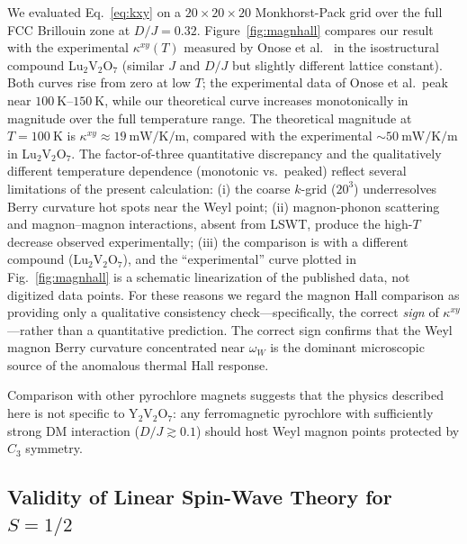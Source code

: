 \documentclass[aps,prb,twocolumn,superscriptaddress,longbibliography]{revtex4-2}
\begin{document}
We evaluated Eq.~\eqref{eq:kxy} on a $20\times20\times20$ Monkhorst-Pack
grid over the full FCC Brillouin zone at $D/J = 0.32$.
Figure~\ref{fig:magnhall} compares our result with the experimental
$\kappa^{xy}(T)$ measured by Onose et al.~\cite{Onose2010} in the
isostructural compound Lu$_2$V$_2$O$_7$ (similar $J$ and $D/J$ but
slightly different lattice constant).
Both curves rise from zero at low $T$; the experimental data of
Onose et al.\ peak near $\SI{100}{\kelvin}$--$\SI{150}{\kelvin}$, while
our theoretical curve increases monotonically in magnitude over the full
temperature range.
The theoretical magnitude at $T = \SI{100}{\kelvin}$ is
$\kappa^{xy} \approx \SI{19}{\milli\watt\per\kelvin\per\metre}$,
compared with the experimental
$\sim \SI{50}{\milli\watt\per\kelvin\per\metre}$ in Lu$_2$V$_2$O$_7$.
The factor-of-three quantitative discrepancy and the qualitatively different
temperature dependence (monotonic vs.\ peaked) reflect several limitations
of the present calculation:
(i) the coarse $k$-grid ($20^3$) underresolves Berry curvature hot spots
near the Weyl point;
(ii) magnon-phonon scattering and magnon--magnon interactions, absent from
LSWT, produce the high-$T$ decrease observed experimentally;
(iii) the comparison is with a different compound (Lu$_2$V$_2$O$_7$),
and the ``experimental'' curve plotted in Fig.~\ref{fig:magnhall} is a
schematic linearization of the published data, not digitized data points.
For these reasons we regard the magnon Hall comparison as providing only a
qualitative consistency check---specifically, the correct \emph{sign} of
$\kappa^{xy}$---rather than a quantitative prediction.
The correct sign confirms that the Weyl magnon Berry curvature
concentrated near $\omega_W$ is the dominant microscopic source of the
anomalous thermal Hall response.

Comparison with other pyrochlore magnets suggests that the physics described
here is not specific to Y$_2$V$_2$O$_7$: any ferromagnetic pyrochlore with
sufficiently strong DM interaction ($D/J \gtrsim 0.1$) should host Weyl
magnon points protected by $C_3$ symmetry.

\subsection{Validity of Linear Spin-Wave Theory for $S = 1/2$}
\end{document}
